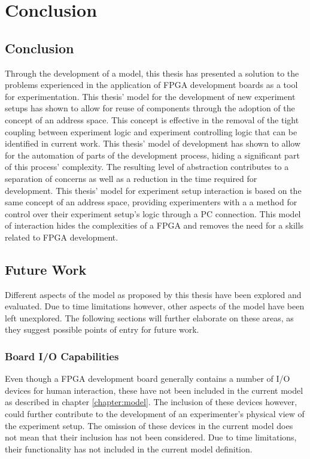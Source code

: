 \documentclass[main.tex]{subfiles}
\begin{document}
\chapter{Conclusion}

\section{Conclusion}
Through the development of a model, this thesis has presented a solution to the problems experienced in the application of FPGA development boards as a tool for experimentation. This thesis' model for the development of new experiment setups has shown to allow for reuse of components through the adoption of the concept of an address space. This concept is effective in the removal of the tight coupling between experiment logic and experiment controlling logic that can be identified in current work. This thesis' model of development has shown to allow for the automation of parts of the development process, hiding a significant part of this process' complexity. The resulting level of abstraction contributes to a separation of concerns as well as a reduction in the time required for development. This thesis' model for experiment setup interaction is based on the same concept of an address space, providing experimenters with a a method for control over their experiment setup's logic through a PC connection. This model of interaction hides the complexities of a FPGA and removes the need for a skills related to FPGA development. 

\section{Future Work}
\label{section:futurework}
Different aspects of the model as proposed by this thesis have been explored and evaluated. Due to time limitations however, other aspects of the model have been left unexplored. The following sections will further elaborate on these areas, as they suggest possible points of entry for future work.

\subsection{Board I/O Capabilities}
Even though a FPGA development board generally contains a number of I/O devices for human interaction, these have not been included in the current model as described in chapter \ref{chapter:model}. The inclusion of these devices however, could further contribute to the development of an experimenter's physical view of the experiment setup. The omission of these devices in the current model does not mean that their inclusion has not been considered. Due to time limitations, their functionality has not included in the current model definition.
\end{document}
